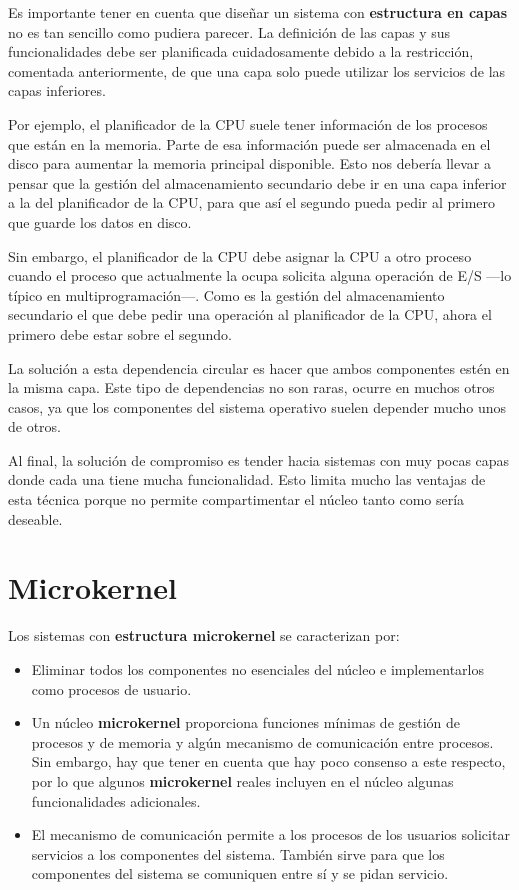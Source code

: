 Es importante tener en cuenta que diseñar un sistema con
\textbf{estructura en capas} no es tan sencillo como pudiera parecer. La
definición de las capas y sus funcionalidades debe ser planificada
cuidadosamente debido a la restricción, comentada anteriormente, de que
una capa solo puede utilizar los servicios de las capas inferiores.

Por ejemplo, el planificador de la CPU suele tener información de los
procesos que están en la memoria. Parte de esa información puede ser
almacenada en el disco para aumentar la memoria principal disponible.
Esto nos debería llevar a pensar que la gestión del almacenamiento
secundario debe ir en una capa inferior a la del planificador de la CPU,
para que así el segundo pueda pedir al primero que guarde los datos en
disco.

Sin embargo, el planificador de la CPU debe asignar la CPU a otro
proceso cuando el proceso que actualmente la ocupa solicita alguna
operación de E/S ---lo típico en multiprogramación---. Como es la
gestión del almacenamiento secundario el que debe pedir una operación al
planificador de la CPU, ahora el primero debe estar sobre el segundo.

La solución a esta dependencia circular es hacer que ambos componentes
estén en la misma capa. Este tipo de dependencias no son raras, ocurre
en muchos otros casos, ya que los componentes del sistema operativo
suelen depender mucho unos de otros.

Al final, la solución de compromiso es tender hacia sistemas con muy
pocas capas donde cada una tiene mucha funcionalidad. Esto limita mucho
las ventajas de esta técnica porque no permite compartimentar el núcleo
tanto como sería deseable.

\section{Microkernel}\label{_microkernel}

{} {} Los sistemas con \textbf{estructura microkernel} se caracterizan
por:

\begin{itemize}
\item
  Eliminar todos los componentes no esenciales del núcleo e
  implementarlos como procesos de usuario.
\item
  Un núcleo \textbf{microkernel} proporciona funciones mínimas de
  gestión de procesos y de memoria y algún mecanismo de comunicación
  entre procesos. Sin embargo, hay que tener en cuenta que hay poco
  consenso a este respecto, por lo que algunos \textbf{microkernel}
  reales incluyen en el núcleo algunas funcionalidades adicionales.
\item
  El mecanismo de comunicación permite a los procesos de los usuarios
  solicitar servicios a los componentes del sistema. También sirve para
  que los componentes del sistema se comuniquen entre sí y se pidan
  servicio.
\end{itemize}

